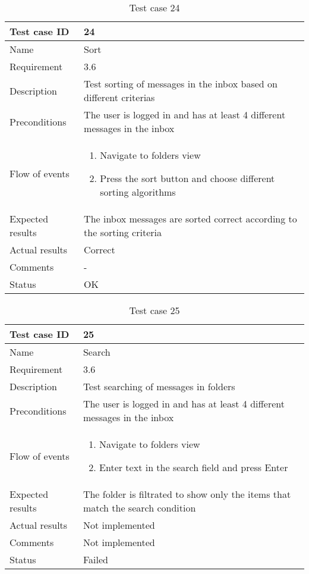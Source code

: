 		\begin{table}
			\begin{tabular}{l|p{10cm}}
				Test case ID & 24 \\ \hline
				Name & Sort\\ \hline
				Requirement & 3.6\\ \hline
				Description & Test sorting of messages in the inbox based on different criterias\\ \hline
				Preconditions & The user is logged in and has at least 4 different messages in the inbox\\ \hline
				Flow of events & 
					\begin{enumerate}
						\item{}Navigate to folders view 
						\item{}Press the sort button and choose different sorting algorithms
					\end{enumerate} \\ \hline
				Expected results & The inbox messages are sorted correct according to the sorting criteria\\ \hline
				Actual results &Correct\\ \hline
				Comments &-\\ \hline
				Status &OK \\ \hline
			\end{tabular}
			\caption{Test case 24} \label{tab:case24}
		\end{table}

		\begin{table}
			\begin{tabular}{l|p{10cm}}
				Test case ID & 25 \\ \hline
				Name & Search\\ \hline
				Requirement & 3.6\\ \hline
				Description & Test searching of messages in folders\\ \hline
				Preconditions & The user is logged in and has at least 4 different messages in the inbox\\ \hline
				Flow of events & 
					\begin{enumerate}
						\item{}Navigate to folders view 
						\item{}Enter text in the search field and press Enter
					\end{enumerate} \\ \hline
				Expected results & The folder is filtrated to show only the items that match the search condition\\ \hline
				Actual results & Not implemented\\ \hline
				Comments & Not implemented\\ \hline
				Status & Failed\\ \hline
			\end{tabular}
			\caption{Test case 25} \label{tab:case25}
		\end{table}

